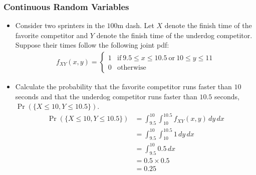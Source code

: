\begin{frame}
\frametitle{Continuous Random Variables} 
\begin{itemize}
\item Consider two sprinters in the $100$m dash. Let $X$ denote the finish time of the favorite competitor and $Y$ denote the finish time of the underdog competitor. Suppose their times follow the following joint pdf:
\begin{align*}
f_{XY}(x,y) = 
  \begin{cases}
  1 & \text{if}~  9.5 \leq x \leq 10.5 ~\text{or}~ 10 \leq y \leq 11 \\
  0 & \text{otherwise}
  \end{cases}
\end{align*}
\item Calculate the probability that the favorite competitor runs faster than $10$ seconds and that the underdog competitor runs faster than $10.5$ seconds, $\Pr(\{X\leq 10, Y\leq 10.5\})$.
\begin{align*}
\Pr(\{X\leq 10,Y\leq 10.5\}) 
  & = \int_{9.5}^{10} \int_{10}^{10.5} f_{XY}(x,y)\,dy\,dx\\
  & = \int_{9.5}^{10} \int_{10}^{10.5} 1 \,dy\,dx\\
  & = \int_{9.5}^{10} 0.5 \,dx\\
  & = 0.5 \times 0.5\\
  & = 0.25
\end{align*}
\end{itemize}
\end{frame}


